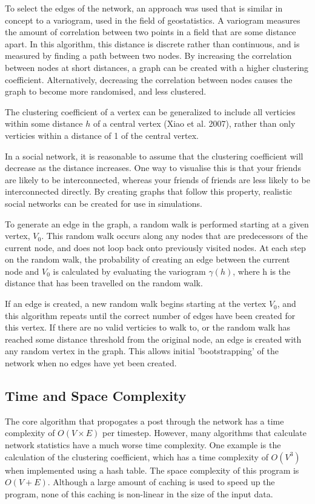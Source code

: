 \documentclass{article}
\begin{document}
To select the edges of the network, an approach was used that is similar in concept
to a variogram, used in the field of geostatistics.
A variogram measures the amount of correlation between two points in a field that are some distance apart.
In this algorithm, this distance is discrete rather than continuous, and is measured by finding
a path between two nodes. By increasing the correlation between nodes at short distances,
a graph can be created with a higher clustering coefficient. Alternatively,
decreasing the correlation between nodes causes the graph to become more randomised,
and less clustered.

The clustering coefficient of a vertex can be generalized to include all verticies
within some distance $h$ of a central vertex (Xiao et al. 2007), rather than
only verticies within a distance of 1 of the central vertex.

In a social network, it is reasonable to assume that the clustering
coefficient will decrease as the distance increases.
One way to visualise this is that your friends are likely to be interconnected,
whereas your friends of friends are less likely to be interconnected directly.
By creating graphs that follow this property, realistic social networks
can be created for use in simulations.

To generate an edge in the graph, a random walk is performed starting at a given vertex, $V_0$.
This random walk occurs along any nodes that are predecessors of the current node,
and does not loop back onto previously visited nodes.
At each step on the random walk, the probability of creating an edge between the current node and $V_0$
is calculated by evaluating the variogram $\gamma (h)$, where h is the distance that has been travelled on the random walk.

If an edge is created, a new random walk begins starting at the vertex $V_0$,
and this algorithm repeats until the correct number of edges have been created
for this vertex.
If there are no valid verticies to walk to,
or the random walk has reached some distance threshold from the original node,
an edge is created with any random vertex in the graph. This allows initial
'bootstrapping' of the network when no edges have yet been created.

\subsection{Time and Space Complexity}
The core algorithm that propogates a post through the network has a time complexity of
$O\left(V \times E\right)$ per timestep.
However, many algorithms that calculate network statistics have a much
worse time complexity. One example is the calculation of the clustering coefficient,
which has a time complexity of $O\left(V^3\right)$ when implemented using a hash table.
The space complexity of this program is $O\left(V + E\right)$. Although
a large amount of caching is used to speed up the program, none of this caching
is non-linear in the size of the input data.
\end{document}
